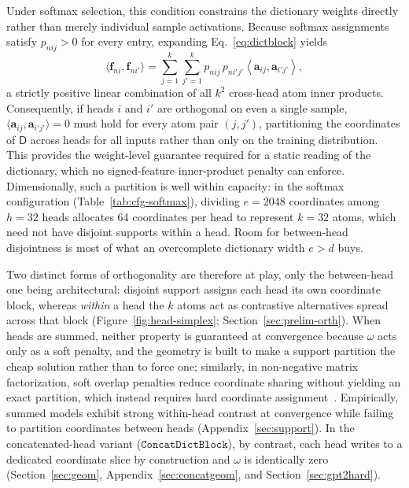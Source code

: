 Under softmax selection, this condition constrains the dictionary weights
directly rather than merely individual sample activations. Because
softmax assignments satisfy $p_{nij} > 0$ for every entry, expanding
Eq.~\eqref{eq:dictblock} yields
\begin{equation}
	\langle \mathbf{f}_{ni},\mathbf{f}_{ni'}\rangle =
	\sum^{k}_{j=1}\sum^{k}_{j'=1} p_{nij}\,p_{ni'j'}
	\left\langle \mathbf{a}_{ij}, \mathbf{a}_{i'j'} \right\rangle,
	\label{eq:cross_head}
\end{equation}
a strictly positive linear combination of all $k^2$ cross-head atom inner
products. Consequently, if heads $i$ and $i'$ are orthogonal on even a
single sample, $\langle \mathbf{a}_{ij}, \mathbf{a}_{i'j'}\rangle = 0$
must hold for every atom pair $(j,j')$, partitioning the coordinates of
$\mathsf{D}$ across heads for all inputs rather than only on the training
distribution. This provides the weight-level guarantee required for a
static reading of the dictionary, which no signed-feature inner-product
penalty can enforce. Dimensionally, such a partition is well within
capacity: in the softmax configuration (Table~\ref{tab:cfg-softmax}),
dividing $e{=}2048$ coordinates among $h{=}32$ heads allocates 64
coordinates per head to represent $k{=}32$ atoms, which need not have
disjoint supports within a head. Room for between-head disjointness is
most of what an overcomplete dictionary width $e > d$ buys.

Two distinct forms of orthogonality are therefore at play, only the
between-head one being architectural: disjoint support assigns each head
its own coordinate block, whereas \emph{within} a head the $k$ atoms act
as contrastive alternatives spread across that block
(Figure~\ref{fig:head-simplex}; Section~\ref{sec:prelim-orth}). When
heads are summed, neither property is guaranteed at convergence because
$\omega$ acts only as a soft penalty, and the geometry is built to make a
support partition the cheap solution rather than to force one; similarly, in non-negative matrix
factorization, soft overlap penalties reduce coordinate sharing without
yielding an exact partition, which instead requires hard coordinate
assignment~\cite{zass2006,pompili2014,asteris2015onmf,charikar2021}.
Empirically, summed models exhibit strong within-head contrast at
convergence while failing to partition coordinates between heads
(Appendix~\ref{sec:support}). In the concatenated-head variant
($\mathtt{ConcatDictBlock}$), by contrast, each head writes to a
dedicated coordinate slice by construction and $\omega$ is identically
zero (Section~\ref{sec:geom}, Appendix~\ref{sec:concatgeom}, and
Section~\ref{sec:gpt2hard}).

